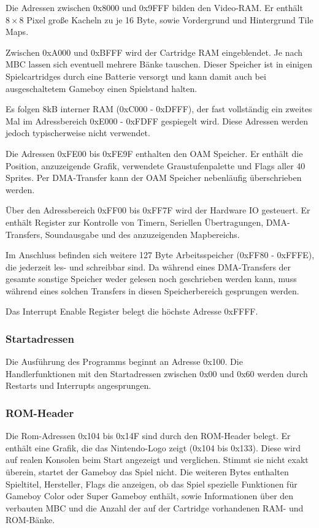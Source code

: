 \documentclass[a4paper]{scrartcl}
\begin{document}
Die Adressen zwischen 0x8000 und 0x9FFF bilden den Video-RAM. Er enthält $8 \times 8$ Pixel große Kacheln zu je 16 Byte, sowie Vordergrund und Hintergrund Tile Maps.

Zwischen 0xA000 und 0xBFFF wird der Cartridge RAM eingeblendet. Je nach MBC lassen sich eventuell mehrere Bänke tauschen. Dieser Speicher ist in einigen Spielcartridges durch eine Batterie versorgt und kann damit auch bei ausgeschaltetem Gameboy einen Spielstand halten.

Es folgen 8kB interner RAM (0xC000 - 0xDFFF), der fast vollständig ein zweites Mal im Adressbereich 0xE000 - 0xFDFF gespiegelt wird. Diese Adressen werden jedoch typischerweise nicht verwendet.

Die Adressen 0xFE00 bis 0xFE9F enthalten den OAM Speicher. Er enthält die Position, anzuzeigende Grafik, verwendete Graustufenpalette und Flags aller 40 Sprites. Per DMA-Transfer kann der OAM Speicher nebenläufig überschrieben werden.

Über den Adressbereich 0xFF00 bis 0xFF7F wird der Hardware IO gesteuert. Er enthält Register zur Kontrolle von Timern, Seriellen Übertragungen, DMA-Transfers, Soundausgabe und des anzuzeigenden Mapbereichs.

Im Anschluss befinden sich weitere 127 Byte Arbeitsspeicher (0xFF80 - 0xFFFE), die jederzeit les- und schreibbar sind. Da während eines DMA-Transfers der gesamte sonstige Speicher weder gelesen noch geschrieben werden kann, muss während eines solchen Transfers in diesen Speicherbereich gesprungen werden.

Das Interrupt Enable Register belegt die höchste Adresse 0xFFFF.

\subsubsection{Startadressen}

Die Ausführung des Programms beginnt an Adresse 0x100. Die Handlerfunktionen mit den Startadressen zwischen 0x00 und 0x60 werden durch Restarts und Interrupts angesprungen. 

\subsubsection{ROM-Header}

Die Rom-Adressen 0x104 bis 0x14F sind durch den ROM-Header belegt. Er enthält eine Grafik, die das Nintendo-Logo zeigt (0x104 bis 0x133). Diese wird auf realen Konsolen beim Start angezeigt und verglichen. Stimmt sie nicht exakt überein, startet der Gameboy das Spiel nicht. Die weiteren Bytes enthalten Spieltitel, Hersteller, Flags die anzeigen, ob das Spiel spezielle Funktionen für Gameboy Color oder Super Gameboy enthält, sowie Informationen über den verbauten MBC und die Anzahl der auf der Cartridge vorhandenen RAM- und ROM-Bänke.
\end{document}
